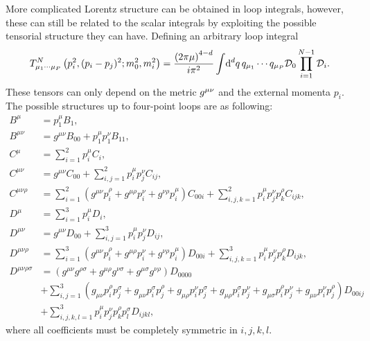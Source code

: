 \documentclass[../main.tex]{subfiles}
\begin{document}
More complicated Lorentz structure can be obtained in loop integrals, however,
these can still be related to the scalar integrals by exploiting the possible
tensorial structure they can have. Defining an arbitrary loop integral
\begin{equation}
  T^N_{\mu_1\cdots\mu_P}\left(p_i^2, (p_i-p_j)^2; m_0^2, m_i^2\right) =
  \frac{\left(2\pi \mu\right)^{4-d}}{i \pi^2} \int \!\mathrm{d}^d q\, q_{\mu_1}\cdots
  q_{\mu_P} \mathcal{D}_0 \prod_{i=1}^{N-1} \mathcal{D}_i.
\end{equation}
These tensors can only depend on the metric \(\tensor{g}{^\mu^\nu}\) and the
external momenta \(p_i\).
The possible structures up to four-point loops are as following:
\begin{subequations}
  \begin{align}
    B^\mu                & = p_1^\mu B_1,
    \\
    B^{\mu\nu}           & = g^{\mu\nu} B_{00} + p_1^\mu p_1^\nu B_{11},
    \\
    C^\mu                & = \sum_{i=1}^2 p_i^\mu C_i,
    \\
    C^{\mu\nu}           & = g^{\mu\nu} C_{00} + \sum_{i,j=1}^{2} p_i^\mu
    p_j^\nu C_{ij},
    \\
    C^{\mu\nu\rho}       & = \sum_{i=1}^2 (g^{\mu\nu} p_i^{\rho} +
    g^{\mu\rho} p_i^{\nu} + g^{\nu\rho} p_i^{\mu}) C_{00i} +
    \sum_{i,j,k=1}^2
    p_i^\mu p_j^\nu p_k^\rho C_{ijk},
    \\
    D^\mu                & = \sum_{i=1}^3 p_i^\mu D_i,
    \\
    D^{\mu\nu}           & = g^{\mu\nu} D_{00} + \sum_{i,j=1}^{3} p_i^\mu
    p_j^\nu D_{ij},
    \\
    D^{\mu\nu\rho}       & = \sum_{i=1}^3 (g^{\mu\nu} p_i^{\rho} +
    g^{\mu\rho} p_i^{\nu} + g^{\nu\rho} p_i^{\mu}) D_{00i} +
    \sum_{i,j,k=1}^3
    p_i^\mu p_j^\nu p_k^\rho D_{ijk},
    \\
    \nonumber
    D^{\mu\nu\rho\sigma} & = (g^{\mu\nu}g^{\rho\sigma} +
    g^{\mu\rho}g^{\nu\sigma} + g^{\mu\sigma}g^{\nu\rho})D_{0000}
    \\
    \nonumber
                         & + \sum_{i,j=1}^3 (g_{\mu\nu}p_i^\rho p_j^\sigma
    + g_{\mu\nu}p_i^\sigma p_j^\rho + g_{\mu\rho}p_i^\nu p_j^\sigma +
    g_{\mu\rho}p_i^\sigma p_j^\nu + g_{\mu\sigma}p_i^\rho p_j^\nu +
    g_{\mu\nu}p_i^\nu p_j^\rho) D_{00ij}
    \\
                         & + \sum_{i,j,k,l=1}^3 p_i^\mu p_j^\nu p_k^\rho
    p_l^\sigma D_{ijkl},
  \end{align}
\end{subequations}
where all coefficients must be completely symmetric in \(i,j,k,l\).


\ifSubfilesClassLoaded{%
  {}
  
}{}
\end{document}
